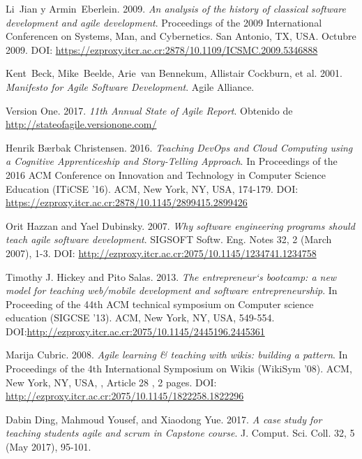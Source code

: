 \documentclass[journal]{IEEEtran}
\begin{document}
\begin{thebibliography}{1}



Li~Jian y Armin~Eberlein. 2009. \emph{An analysis of the history of classical software development and agile development}. Proceedings of the 2009 International Conferencen on Systems, Man, and Cybernetics. San Antonio, TX, USA. Octubre 2009. DOI: \url{https://ezproxy.itcr.ac.cr:2878/10.1109/ICSMC.2009.5346888}

Kent~Beck, Mike~Beelde, Arie~van Bennekum, Allistair Cockburn, et al. 2001. \emph{Manifesto for Agile Software Development}. Agile Alliance.

Version One. 2017. \emph{11th Annual State of Agile Report}. Obtenido de \url{http://stateofagile.versionone.com/}

Henrik Bærbak Christensen. 2016. \emph{Teaching DevOps and Cloud Computing using a Cognitive Apprenticeship and Story-Telling Approach}. In Proceedings of the 2016 ACM Conference on Innovation and Technology in Computer Science Education (ITiCSE '16). ACM, New York, NY, USA, 174-179. DOI: \url{https://ezproxy.itcr.ac.cr:2878/10.1145/2899415.2899426}

Orit Hazzan and Yael Dubinsky. 2007. \emph{Why software engineering programs should teach agile software development}. SIGSOFT Softw. Eng. Notes 32, 2 (March 2007), 1-3. DOI: \url{http://ezproxy.itcr.ac.cr:2075/10.1145/1234741.1234758} 

Timothy J. Hickey and Pito Salas. 2013. \emph{The entrepreneur`s bootcamp: a new model for teaching web/mobile development and software entrepreneurship}. In Proceeding of the 44th ACM technical symposium on Computer science education (SIGCSE '13). ACM, New York, NY, USA, 549-554. DOI:\url{http://ezproxy.itcr.ac.cr:2075/10.1145/2445196.2445361}

Marija Cubric. 2008. \emph{Agile learning \& teaching with wikis: building a pattern}. In Proceedings of the 4th International Symposium on Wikis (WikiSym '08). ACM, New York, NY, USA, , Article 28 , 2 pages. DOI: \url{http://ezproxy.itcr.ac.cr:2075/10.1145/1822258.1822296}

Dabin Ding, Mahmoud Yousef, and Xiaodong Yue. 2017. \emph{A case study for teaching students agile and scrum in Capstone course}. J. Comput. Sci. Coll. 32, 5 (May 2017), 95-101.


\end{thebibliography}
\end{document}
